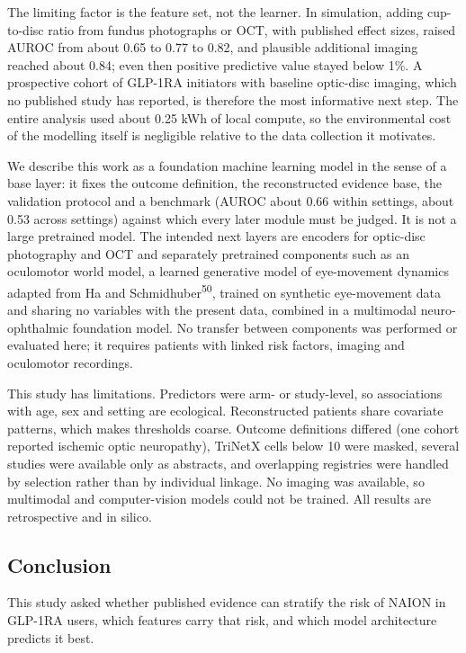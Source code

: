 \documentclass[
  11pt,
]{article}
\begin{document}
The limiting factor is the feature set, not the learner. In simulation,
adding cup-to-disc ratio from fundus photographs or OCT, with published
effect sizes, raised AUROC from about 0.65 to 0.77 to 0.82, and
plausible additional imaging reached about 0.84; even then positive
predictive value stayed below 1\%. A prospective cohort of GLP-1RA
initiators with baseline optic-disc imaging, which no published study
has reported, is therefore the most informative next step. The entire
analysis used about 0.25 kWh of local compute, so the environmental cost
of the modelling itself is negligible relative to the data collection it
motivates.

We describe this work as a foundation machine learning model in the
sense of a base layer: it fixes the outcome definition, the
reconstructed evidence base, the validation protocol and a benchmark
(AUROC about 0.66 within settings, about 0.53 across settings) against
which every later module must be judged. It is not a large pretrained
model. The intended next layers are encoders for optic-disc photography
and OCT and separately pretrained components such as an oculomotor world
model, a learned generative model of eye-movement dynamics adapted from
Ha and Schmidhuber\textsuperscript{50}, trained on synthetic
eye-movement data and sharing no variables with the present data,
combined in a multimodal neuro-ophthalmic foundation model. No transfer
between components was performed or evaluated here; it requires patients
with linked risk factors, imaging and oculomotor recordings.

This study has limitations. Predictors were arm- or study-level, so
associations with age, sex and setting are ecological. Reconstructed
patients share covariate patterns, which makes thresholds coarse.
Outcome definitions differed (one cohort reported ischemic optic
neuropathy), TriNetX cells below 10 were masked, several studies were
available only as abstracts, and overlapping registries were handled by
selection rather than by individual linkage. No imaging was available,
so multimodal and computer-vision models could not be trained. All
results are retrospective and in silico.

\subsection{Conclusion}\label{conclusion}

This study asked whether published evidence can stratify the risk of
NAION in GLP-1RA users, which features carry that risk, and which model
architecture predicts it best.
\end{document}
